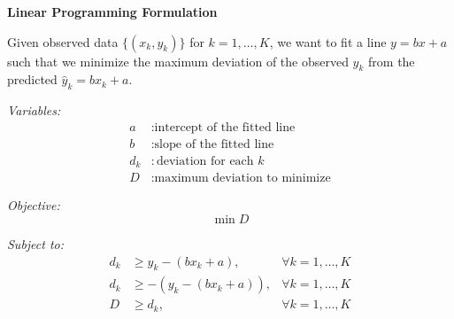 \documentclass{article}
\begin{document}
\textbf{Linear Programming Formulation}

Given observed data \(\{(x_k, y_k)\}\) for \(k = 1, \ldots, K\), we want to fit a line \(y = bx + a\) such that we minimize the maximum deviation of the observed \(y_k\) from the predicted \(\hat{y}_k = bx_k + a\).

\textit{Variables:}
\begin{align*}
a & : \text{intercept of the fitted line} \\
b & : \text{slope of the fitted line} \\
d_k & : \text{deviation for each } k \\
D & : \text{maximum deviation to minimize}
\end{align*}

\textit{Objective:}
\[
\min D
\]

\textit{Subject to:}
\begin{align*}
d_k & \geq y_k - (bx_k + a), & \forall k = 1, \ldots, K \\
d_k & \geq -(y_k - (bx_k + a)), & \forall k = 1, \ldots, K \\
D & \geq d_k, & \forall k = 1, \ldots, K
\end{align*}
\end{document}
